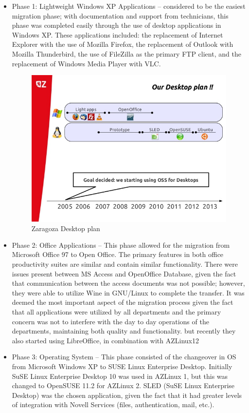 \begin{itemize}
\item Phase 1: Lightweight Windows XP Applications – considered to be the easiest migration phase; with documentation and support from technicians, this phase was completed easily through the use of desktop applications in Windows XP. These applications included: the replacement of Internet Explorer with the use of Mozilla Firefox, the replacement of Outlook with Mozilla Thunderbird, the use of FileZilla as the primary FTP client, and the replacement of Windows Media Player with VLC.

  \begin{figure}
     \centering
         \includegraphics[scale=0.5]{img/zaragoza_desktopplan.png} 
       \caption[Zaragoza Desktop plan]{Zaragoza Desktop plan \protect\footnotemark}
         \end{figure}


\item Phase 2: Office Applications – This phase allowed for the migration from Microsoft Office 97 to Open Office. The primary features in both office productivity suites are similar and contain similar functionality. There were issues present between MS Access and OpenOffice Database, given the fact that communication between the access documents was not possible; however, they were able to utilize Wine in GNU/Linux to complete the transfer. It was deemed the most important aspect of the migration process given the fact that all applications were utilized by all departments and the primary concern was not to interfere with the day to day operations of the departments, 
maintaining both quality and functionality. 
but recently they also started using LibreOffice, in combination with AZLinux12

\item Phase 3: Operating System – This phase consisted of the changeover in OS from Microsoft Windows XP to SUSE Linux Enterprise Desktop. Initially SuSE Linux Enterprise Desktop 10 was used in AZLinux 1, but this was changed to OpenSUSE 11.2 for AZLinux 2. SLED (SuSE Linux Enterprise Desktop) was the chosen application, given the fact that it had greater levels of integration with Novell Services (files, authentication, mail, etc.).
\end{itemize}

